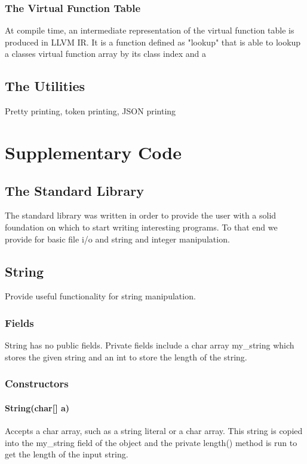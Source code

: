 \begin{homeworkProblem}
    \subsubsection{The Virtual Function Table}
	At compile time, an intermediate representation of the virtual function table is produced in LLVM IR. It is a function defined as "lookup" that is able to lookup a classes virtual function array by its class index and a 

	\subsection{The Utilities}
	Pretty printing, token printing, JSON printing
	\section{Supplementary Code}
	\subsection{The Standard Library}
	The standard library was written in order to provide the user with a solid foundation on which to start writing interesting programs. To that end we provide for basic file i/o and string and integer manipulation.
	
	\subsection{String}
	Provide useful functionality for string manipulation.
	
	\subsubsection{Fields}
	String has no public fields. Private fields include a char array my\_string which stores the given string and an int to store the length of the string. 
	
	\subsubsection{Constructors}
	\paragraph{String(char[] a)}
	Accepts a char array, such as a string literal or a char array. This string is copied into the my\_string field of the object and the private length() method is run to get the length of the input string.
	

\end{homeworkProblem}
